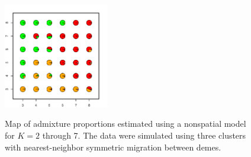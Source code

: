 \documentclass[12pt]{article}
\begin{document}
\begin{figure}
			{\includegraphics[width=1.8in,height=1.8in]{figs/sims/simK3_nsp_pies_K7.pdf}}
	\caption{
	Map of admixture proportions estimated using a nonspatial model for $K=2$ through 7.
	The data were simulated using three clusters with nearest-neighbor symmetric migration between demes.
    }\label{simK3_nsp_pies}
\end{figure}
\end{document}
